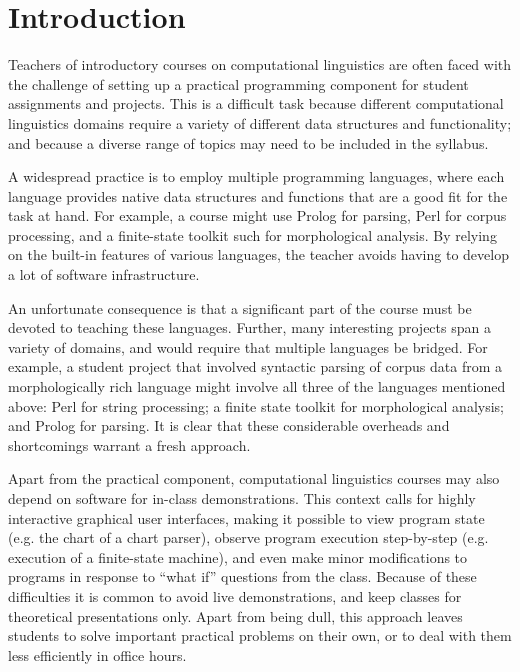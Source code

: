 \documentclass[11pt]{article}
\begin{document}
\section{Introduction}

Teachers of introductory courses on computational linguistics are
often faced with the challenge of setting up a practical programming
component for student assignments and projects.  This is a difficult
task because different computational linguistics domains require a
variety of different data structures and functionality; and because a
diverse range of topics may need to be included in the syllabus.

A widespread practice is to employ multiple programming languages,
where each language provides native data structures and functions that
are a good fit for the task at hand.  For example, a course might use
Prolog for parsing, Perl for corpus processing, and a finite-state
toolkit such for morphological analysis.  By relying on the built-in
features of various languages, the teacher avoids having to develop a
lot of software infrastructure.

An unfortunate consequence is that a significant part of the course
must be devoted to teaching these languages.  Further, many
interesting projects span a variety of domains, and would require that
multiple languages be bridged.  For example, a student project that
involved syntactic parsing of corpus data from a morphologically rich
language might involve all three of the languages mentioned above:
Perl for string processing; a finite state toolkit for morphological
analysis; and Prolog for parsing.
It is clear that these considerable overheads and shortcomings warrant
a fresh approach.

Apart from the practical component, computational linguistics courses
may also depend on software for in-class demonstrations.  This context
calls for highly interactive graphical user interfaces, making it
possible to view program state (e.g. the chart of a chart parser),
observe program execution step-by-step (e.g. execution of a
finite-state machine), and even make minor modifications to programs
in response to ``what if'' questions from the class.  Because of these
difficulties it is common to avoid live demonstrations, and keep
classes for theoretical presentations only.  Apart from being dull,
this approach leaves students to solve important practical problems on
their own, or to deal with them less efficiently in office hours.
\end{document}
